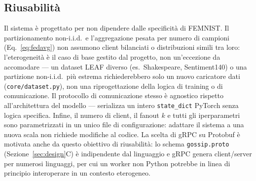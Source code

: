 \subsection{Riusabilità}
Il sistema è progettato per non dipendere dalle specificità di FEMNIST. Il
partizionamento non-i.i.d.\ e l'aggregazione pesata per numero di campioni
(Eq.~\ref{eq:fedavg}) non assumono client bilanciati o distribuzioni simili
tra loro: l'eterogeneità è il caso di base gestito dal progetto, non
un'eccezione da accomodare — un dataset LEAF diverso (es.\ Shakespeare,
Sentiment140) o una partizione non-i.i.d.\ più estrema richiederebbero solo
un nuovo caricatore dati (\texttt{core/dataset.py}), non una riprogettazione
della logica di training o di comunicazione. Il protocollo di comunicazione
stesso è agnostico rispetto all'architettura del modello — serializza un
intero \texttt{state\_dict} PyTorch senza logica specifica. Infine, il
numero di client, il fanout $k$ e tutti gli iperparametri sono parametrizzati
in un unico file di
configurazione: adattare il sistema a una nuova scala non richiede modifiche
al codice. La scelta di gRPC su Protobuf è motivata anche da questo obiettivo di
riusabilità: lo schema \texttt{gossip.proto} (Sezione~\ref{sec:design}C) è
indipendente dal linguaggio e gRPC genera client/server per numerosi
linguaggi, per cui un worker non Python potrebbe in linea di principio
interoperare in un contesto eterogeneo.
